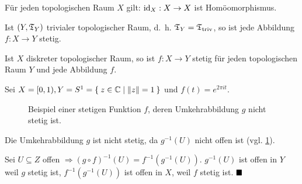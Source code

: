\begin{beispiel}
    \begin{bspenum}
        \item Für jeden topologischen Raum $X$ gilt: $\textnormal{id}_X : X \rightarrow X$
              ist Homöomorphismus.
        \item Ist $(Y, \mathfrak{T}_Y)$ trivialer topologischer Raum, d.~h. $\mathfrak{T}_Y = \mathfrak{T}_\text{triv}$,
              so ist jede Abbildung $f:X \rightarrow Y$ stetig.
        \item Ist $X$ diskreter topologischer Raum, so ist $f:X \rightarrow Y$
              stetig für jeden topologischen Raum $Y$ und jede Abbildung $f$.
        \item Sei $X = [0, 1), Y = S^1 = \Set{z \in \ensuremath{\mathbb{C}}| \|z\| = 1}$
              und $f(t) = e^{2 \pi i t}$.

              \begin{figure}[htp]
                \centering
                
                \caption{Beispiel einer stetigen Funktion $f$, deren 
                         Umkehrabbildung $g$ nicht stetig ist.}
                \label{fig:nicht-stetige-umkehrabbildung}
              \end{figure}
              
              Die Umkehrabbildung $g$ ist nicht stetig, da $g^{-1}(U)$
              nicht offen ist (vgl. \cref{fig:nicht-stetige-umkehrabbildung}).
    \end{bspenum}
\end{beispiel}


\begin{beweis}
    Sei $U \subseteq Z$ offen $\Rightarrow (g \circ f)^{-1} (U) = f^{-1} (g^{-1}(U))$.
    $g^{-1}(U)$ ist offen in $Y$ weil $g$ stetig ist, $f^{-1}(g^{-1}(U))$
    ist offen in $X$, weil $f$ stetig ist. $\qed$
\end{beweis}

